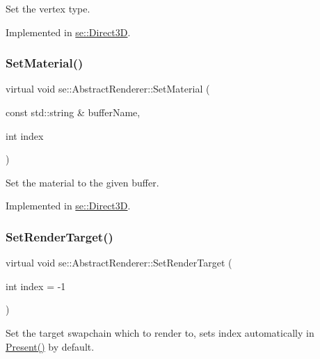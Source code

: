 Set the vertex type. 

Implemented in \mbox{\hyperlink{classse_1_1_direct3_d_a1bf0217e47f4fb360f427517f86c75cd}{se\+::\+Direct3D}}.

\mbox{\label{classse_1_1_abstract_renderer_a1253152682a025722fd97d4bfa981d45}} 
\subsubsection{\texorpdfstring{Set\+Material()}{SetMaterial()}}
{\footnotesize\ttfamily virtual void se\+::\+Abstract\+Renderer\+::\+Set\+Material (\begin{DoxyParamCaption}\item[{const std\+::string \&}]{buffer\+Name,  }\item[{int}]{index }\end{DoxyParamCaption})\hspace{0.3cm}{\ttfamily [pure virtual]}}

Set the material to the given buffer. 

Implemented in \mbox{\hyperlink{classse_1_1_direct3_d_acfaad7a7cfbace7d34eb7dae9e9bf9d2}{se\+::\+Direct3D}}.

\mbox{\label{classse_1_1_abstract_renderer_a5cf80b0b47191f9445d6a5fa5fc02a3e}} 
\subsubsection{\texorpdfstring{Set\+Render\+Target()}{SetRenderTarget()}}
{\footnotesize\ttfamily virtual void se\+::\+Abstract\+Renderer\+::\+Set\+Render\+Target (\begin{DoxyParamCaption}\item[{int}]{index = {\ttfamily -\/1} }\end{DoxyParamCaption})\hspace{0.3cm}{\ttfamily [pure virtual]}}

Set the target swapchain which to render to, sets index automatically in \mbox{\hyperlink{classse_1_1_abstract_renderer_a5102e4df9100f6c0df9c26beaca6c4e4}{Present()}} by default. 

